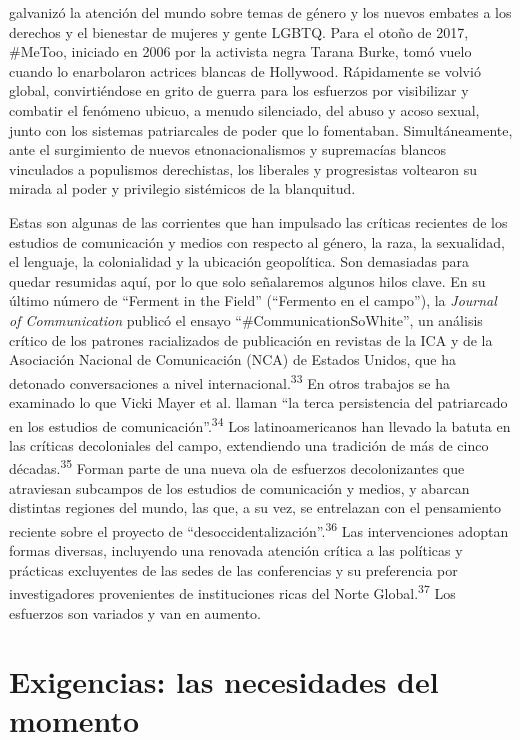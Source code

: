 \documentclass{tufte-handout}
\begin{document}
galvanizó la atención del mundo sobre temas de género y los nuevos
embates a los derechos y el bienestar de mujeres y gente LGBTQ. Para el
otoño de 2017, \#MeToo, iniciado en 2006 por la activista negra Tarana
Burke, tomó vuelo cuando lo enarbolaron actrices blancas de Hollywood.
Rápidamente se volvió global, convirtiéndose en grito de guerra para los
esfuerzos por visibilizar y combatir el fenómeno ubicuo, a menudo
silenciado, del abuso y acoso sexual, junto con los sistemas
patriarcales de poder que lo fomentaban. Simultáneamente, ante el
surgimiento de nuevos etnonacionalismos y supremacías blancos vinculados
a populismos derechistas, los liberales y progresistas voltearon su
mirada al poder y privilegio sistémicos de la blanquitud.

Estas son algunas de las corrientes que han impulsado las críticas
recientes de los estudios de comunicación y medios con respecto al
género, la raza, la sexualidad, el lenguaje, la colonialidad y la
ubicación geopolítica. Son demasiadas para quedar resumidas aquí, por lo
que solo señalaremos algunos hilos clave. En su último número de
``Ferment in the Field'' (``Fermento en el campo''), la \emph{Journal of
Communication} publicó el ensayo ``\#CommunicationSoWhite'', un análisis
crítico de los patrones racializados de publicación en revistas de la
ICA y de la Asociación Nacional de Comunicación (NCA) de Estados Unidos,
que ha detonado conversaciones a nivel internacional.\textsuperscript{33} En otros trabajos se ha examinado lo que Vicki Mayer et al.
llaman ``la terca persistencia del patriarcado en los estudios de
comunicación''.\textsuperscript{34} Los latinoamericanos han llevado la batuta en las críticas
decoloniales del campo, extendiendo una tradición de más de cinco
décadas.\textsuperscript{35} Forman parte de una nueva ola de esfuerzos decolonizantes que
atraviesan subcampos de los estudios de comunicación y medios, y abarcan
distintas regiones del mundo, las que, a su vez, se entrelazan con el
pensamiento reciente sobre el proyecto de
``desoccidentalización''.\textsuperscript{36} Las intervenciones adoptan formas diversas, incluyendo
una renovada atención crítica a las políticas y prácticas excluyentes de
las sedes de las conferencias y su preferencia por investigadores
provenientes de instituciones ricas del Norte Global.\textsuperscript{37} Los esfuerzos son variados y van en
aumento.

\hypertarget{exigencias-las-necesidades-del-momento}{%
\section{Exigencias: las necesidades del
momento}\label{exigencias-las-necesidades-del-momento}}
\end{document}
